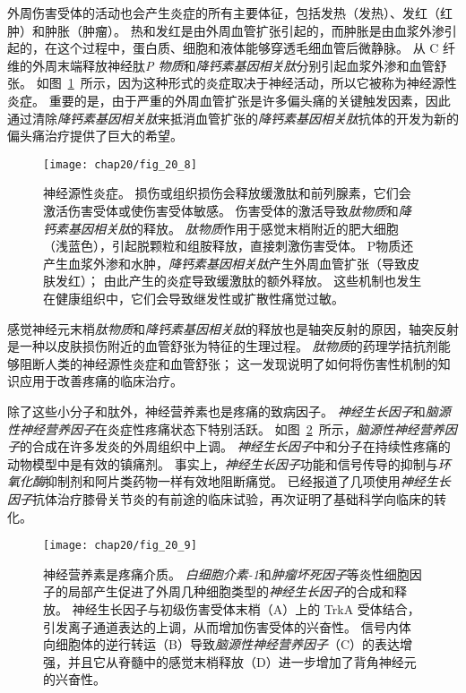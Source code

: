 外周伤害受体的活动也会产生炎症的所有主要体征，包括发热（发热）、发红（红肿）和肿胀（肿瘤）。
热和发红是由外周血管扩张引起的，而肿胀是由血浆外渗引起的，在这个过程中，蛋白质、细胞和液体能够穿透毛细血管后微静脉。
从 C 纤维的外周末端释放神经肽\textit{P 物质}和\textit{降钙素基因相关肽}分别引起血浆外渗和血管舒张。
如图~\ref{fig:20_8}~所示，因为这种形式的炎症取决于神经活动，所以它被称为神经源性炎症。
重要的是，由于严重的外周血管扩张是许多偏头痛的关键触发因素，因此通过清除\textit{降钙素基因相关肽}来抵消血管扩张的\textit{降钙素基因相关肽}抗体的开发为新的偏头痛治疗提供了巨大的希望。


\begin{figure}[htbp]
	\centering
	\texttt{[image: chap20/fig\_20\_8]}
	\caption{神经源性炎症。
		损伤或组织损伤会释放缓激肽和前列腺素，它们会激活伤害受体或使伤害受体敏感。
		伤害受体的激活导致\textit{肽物质}和\textit{降钙素基因相关肽}的释放。
		\textit{肽物质}作用于感觉末梢附近的肥大细胞（浅蓝色），引起脱颗粒和组胺释放，直接刺激伤害受体。
		P物质还产生血浆外渗和水肿，\textit{降钙素基因相关肽}产生外周血管扩张（导致皮肤发红）；
		由此产生的炎症导致缓激肽的额外释放。
		这些机制也发生在健康组织中，它们会导致继发性或扩散性痛觉过敏。}
	\label{fig:20_8}
\end{figure}


感觉神经元末梢\textit{肽物质}和\textit{降钙素基因相关肽}的释放也是轴突反射的原因，轴突反射是一种以皮肤损伤附近的血管舒张为特征的生理过程。
\textit{肽物质}的药理学拮抗剂能够阻断人类的神经源性炎症和血管舒张；
这一发现说明了如何将伤害性机制的知识应用于改善疼痛的临床治疗。


除了这些小分子和肽外，神经营养素也是疼痛的致病因子。
\textit{神经生长因子}和\textit{脑源性神经营养因子}在炎症性疼痛状态下特别活跃。
如图~\ref{fig:20_9}~所示，\textit{脑源性神经营养因子}的合成在许多发炎的外周组织中上调。
\textit{神经生长因子}中和分子在持续性疼痛的动物模型中是有效的镇痛剂。
事实上，\textit{神经生长因子}功能和信号传导的抑制与\textit{环氧化酶}抑制剂和阿片类药物一样有效地阻断痛觉。
已经报道了几项使用\textit{神经生长因子}抗体治疗膝骨关节炎的有前途的临床试验，再次证明了基础科学向临床的转化。


\begin{figure}[htbp]
	\centering
	\texttt{[image: chap20/fig\_20\_9]}
	\caption{神经营养素是疼痛介质。
		\textit{白细胞介素-1}和\textit{肿瘤坏死因子}等炎性细胞因子的局部产生促进了外周几种细胞类型的\textit{神经生长因子}的合成和释放。
		神经生长因子与初级伤害受体末梢（A）上的 TrkA 受体结合，引发离子通道表达的上调，从而增加伤害受体的兴奋性。
		信号内体向细胞体的逆行转运（B）导致\textit{脑源性神经营养因子}（C）的表达增强，并且它从脊髓中的感觉末梢释放（D）进一步增加了背角神经元的兴奋性。}
	\label{fig:20_9}
\end{figure}


